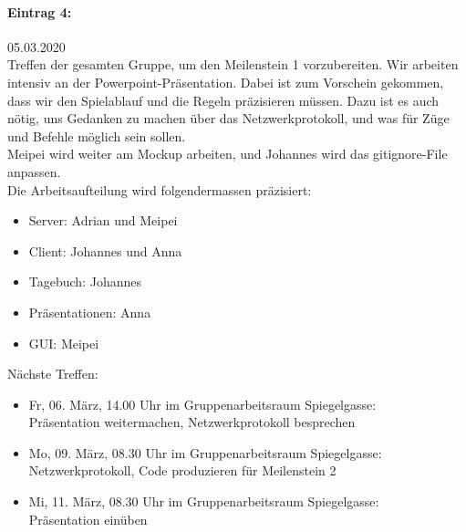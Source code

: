 \documentclass[12pt]{article}
\begin{document}
\paragraph{Eintrag 4:}
05.03.2020\\
Treffen der gesamten Gruppe, um den Meilenstein 1 vorzubereiten. Wir arbeiten intensiv an der Powerpoint-Präsentation. Dabei ist zum Vorschein gekommen, dass wir den Spielablauf und die Regeln präzisieren müssen. Dazu ist es auch nötig, uns Gedanken zu machen über das Netzwerkprotokoll, und was für Züge und Befehle möglich sein sollen.\\
Meipei wird weiter am Mockup arbeiten, und Johannes wird das gitignore-File anpassen.\\
Die Arbeitsaufteilung wird folgendermassen präzisiert:
\begin{itemize}
\item Server: Adrian und Meipei
\item Client: Johannes und Anna
\item Tagebuch: Johannes
\item Präsentationen: Anna
\item GUI: Meipei\\
\end{itemize}

Nächste Treffen:
\begin{itemize}
\item Fr, 06. März, 14.00 Uhr im Gruppenarbeitsraum Spiegelgasse:\\
Präsentation weitermachen, Netzwerkprotokoll besprechen
\item Mo, 09. März, 08.30 Uhr im Gruppenarbeitsraum Spiegelgasse:\\
Netzwerkprotokoll, Code produzieren für Meilenstein 2
\item Mi, 11. März, 08.30 Uhr im Gruppenarbeitsraum Spiegelgasse:\\
Präsentation einüben
\end{itemize}
\end{document}
